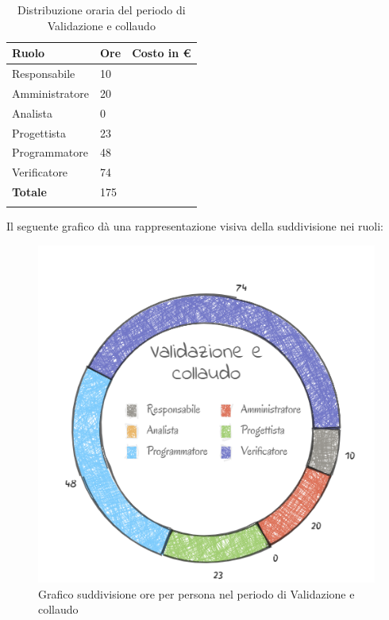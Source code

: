 \begin{longtable}{| C{.30\textwidth}| C{.15\textwidth}| C{.20\textwidth}|}
	\hline
	\textbf{Ruolo} & \textbf{Ore} & \textbf{Costo in \euro} \\
	\hline 
	Responsabile & 10 &  \\
	\hline
	Amministratore & 20 & \\
	\hline
	Analista & 0 &  \\
	\hline
	Progettista & 23 &  \\
	\hline
	Programmatore & 48 &  \\
	\hline
	Verificatore & 74 &  \\
	\hline
	\textbf{Totale} & 175 & \\ 
	\hline
	
	\caption{Distribuzione oraria del periodo di Validazione e collaudo}
	\label{Distribuzione oraria del periodo di Validazione e collaudo}
\end{longtable}

Il seguente grafico dà una rappresentazione visiva della suddivisione nei ruoli:
\begin{figure}[H]
	\centering
	\includegraphics[width=0.8\linewidth]{./images/torta_validazione_col.png}
	\caption{Grafico suddivisione ore per persona nel periodo di Validazione e collaudo}
	\label{fig:grafico suddivione ruoli periodo di Validazione e collaudo}
\end{figure}

\newpage

